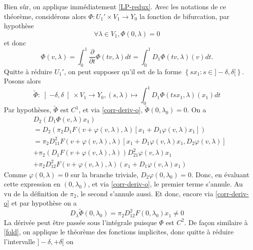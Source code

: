 \documentclass[memoire.tex]{subfiles}
\begin{document}
\begin{preuve}
    Bien sûr, on applique immédiatement \ref{LP-redux}. Avec les notations de ce théorème, considérons alors $\Phi: U_1'\times V_1\rightarrow Y_0$ la fonction de bifurcation, par hypothèse
    \begin{equation*}
        \forall \lambda\in V_1,\Phi(0,\lambda)=0
    \end{equation*}
    et donc
    \begin{equation*}
        \Phi(v,\lambda)=\int_0^1 \frac{\partial}{\partial t} \Phi(tv,\lambda)dt=\int_0^1 D_1\Phi(tv,\lambda)(v) dt.
    \end{equation*}
    Quitte à réduire $U_1'$, on peut supposer qu'il est de la forme $\left\{ sx_1: s\in]-\delta,\delta[ \right\}$. Posons alors
    \begin{equation*}
        \tilde{\Phi}:\left] -\delta,\delta \right[\times V_1\rightarrow Y_0,(s,\lambda)\mapsto \int_0^1 D_1\Phi(tsx_1,\lambda)(x_1) dt
    \end{equation*}
    Par hypothèses, $\tilde{\Phi}$ est $C^1$, et via \ref{corr-deriv-o}, $\tilde{\Phi}(0,\lambda_0)=0$.
    On a 
    \begin{align*}
        &D_{2}(D_1 \Phi(v,\lambda)x_1)\\
        &= D_{2}\left(\pi_2 D_1 F(v+\varphi(v,\lambda),\lambda)[x_1+ D_1\varphi(v,\lambda)x_1]\right)\\
        &=\pi_2 D^2_{11}F(v+\varphi(v,\lambda),\lambda) [x_1+D_1\varphi(v,\lambda)x_1,D_2\varphi(v,\lambda)]\\
        &+\pi_2(D_1 F(v+\varphi(v,\lambda),\lambda))D^2_{21}\varphi(v,\lambda)x_1\\
        &+\pi_2 D^2_{12}F(v+\varphi(v,\lambda),\lambda)(x_1+D_1\varphi(v,\lambda)x_1)
    \end{align*}
    Comme $\varphi(0,\lambda)=0$ sur la branche triviale, $D_2\varphi(0,\lambda_0)=0$.
    Donc, en évaluant cette expression en $(0,\lambda_0)$, et via \ref{corr-deriv-o}, le premier terme s'annule. Au vu de la définition de $\pi_2$, le second s'annule aussi. Et donc, encore via \ref{corr-deriv-o} et par hypothèse on a
    \begin{equation*}
        D_{\lambda}\tilde{\Phi}(0,\lambda_0)=\pi_2 D^2_{12}F(0,\lambda_0)x_1\neq 0
    \end{equation*}
    La dérivée peut être passée sous l'intégrale puisque $\Phi$ est $C^2$.
    De façon similaire à \ref{fold}, on applique le théorème des fonctions 
    implicites, donc quitte à réduire l'intervalle $]-\delta,+\delta[$ on 

\end{preuve}
\end{document}
